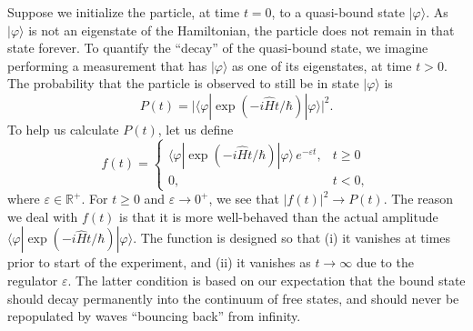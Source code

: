 \documentclass[prx,12pt]{revtex4-2}
\begin{document}
Suppose we initialize the particle, at time $t = 0$, to a quasi-bound
state $|\varphi\rangle$.  As $|\varphi\rangle$ is not an eigenstate of
the Hamiltonian, the particle does not remain in that state forever.
To quantify the ``decay'' of the quasi-bound state, we imagine
performing a measurement that has $|\varphi\rangle$ as one of its
eigenstates, at time $t > 0$.  The probability that the particle is
observed to still be in state $|\varphi\rangle$ is
\begin{equation}
  P(t) = \Big|\langle\varphi|\exp\left(-i\hat{H}t/\hbar\right)|\varphi\rangle\Big|^2.
\end{equation}
To help us calculate $P(t)$, let us define
\begin{equation}
  f(t) = \begin{cases} \langle\varphi|\exp\left(-i\hat{H}t/\hbar\right)|\varphi\rangle \,e^{-\varepsilon t}, & t \ge 0 \\ 0, & t < 0,\end{cases}
  \label{fregulated}
\end{equation}
where $\varepsilon \in \mathbb{R}^+$.  For $t \ge 0$ and $\varepsilon
\rightarrow 0^+$, we see that $|f(t)|^2 \rightarrow P(t)$.  The reason
we deal with $f(t)$ is that it is more well-behaved than the actual
amplitude $\langle\varphi|\exp(-i\hat{H}t/\hbar)|\varphi\rangle$.  The
function is designed so that (i) it vanishes at times prior to start
of the experiment, and (ii) it vanishes as $t\rightarrow\infty$ due to
the regulator $\varepsilon$.  The latter condition is based on our
expectation that the bound state should decay permanently into the
continuum of free states, and should never be repopulated by waves
``bouncing back'' from infinity.
\end{document}
